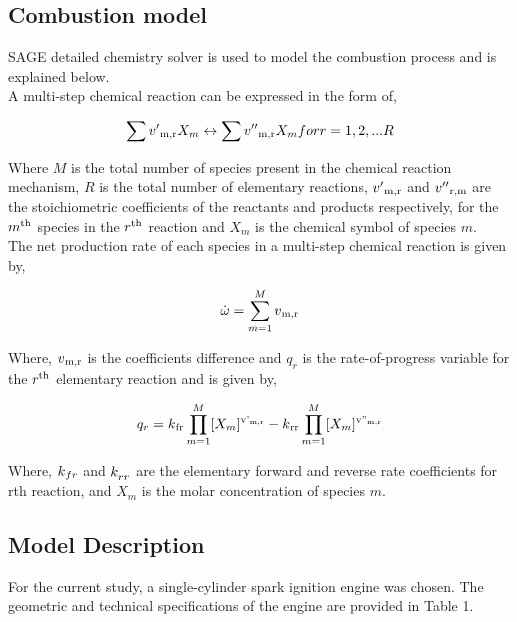\documentclass[conference]{IEEEtran}
\begin{document}
\subsection{Combustion model}
SAGE detailed chemistry solver is used to model the combustion process and is explained below.\\
A multi-step chemical reaction can be expressed in the form of,

\begin{gather*}
    \sum v'\textsubscript{m,r} X_m \leftrightarrow \sum v''\textsubscript{m,r} X_m for  r = 1,2,...R
\end{gather*}

Where $M$ is the total number of species present in the chemical reaction mechanism, $R$ is the total number of elementary reactions, $v'\textsubscript{m,r}$ and $v''\textsubscript{r,m}$ are the stoichiometric coefficients of the reactants and products respectively, for the $m\textsuperscript{th}$ species in the $r\textsuperscript{th}$ reaction and $X_m$ is the chemical symbol of species $m$.\\

The net production rate of each species in a multi-step chemical reaction is given by,

\begin{gather*}
    \dot\omega = \sum_{m=1}^{M} v\textsubscript{m,r} 
\end{gather*}

Where, $v\textsubscript{m,r}$ is the coefficients difference and $q_r$ is the rate-of-progress variable for the $r\textsuperscript{th}$ elementary reaction and is given by,

\begin{gather*}
    q_r = k\textsubscript{fr} \prod_{m=1}^{M} [X_m]\textsuperscript{v'\textsubscript{m,r}} - k\textsubscript{rr} \prod_{m=1}^{M} [X_m]\textsuperscript{v''\textsubscript{m,r}}
\end{gather*}

Where, $k\textsubscript{$fr$}$ and $k_\textsubscript{$rr$}$ are the elementary forward and reverse rate coefficients for rth reaction, and $X_m$ is the molar concentration of species $m$.

\subsection{Model Description}
For the current study, a single-cylinder spark ignition engine was chosen. The geometric and technical specifications of the engine are provided in Table 1. 
\end{document}
